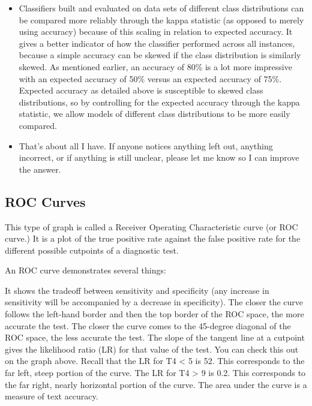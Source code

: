 \documentclass[caret-main.tex]{subfiles}
\begin{document}
\begin{itemize}
\item Classifiers built and evaluated on data sets of different class distributions can be compared more reliably through the kappa statistic (as opposed to merely using accuracy) because of this scaling in relation to expected accuracy. It gives a better indicator of how the classifier performed across all instances, because a simple accuracy can be skewed if the class distribution is similarly skewed. As mentioned earlier, an accuracy of 80\% is a lot more impressive with an expected accuracy of 50\% versus an expected accuracy of 75\%. Expected accuracy as detailed above is susceptible to skewed class distributions, so by controlling for the expected accuracy through the kappa statistic, we allow models of different class distributions to be more easily compared.

\item That's about all I have. If anyone notices anything left out, anything incorrect, or if anything is still unclear, please let me know so I can improve the answer.
\end{itemize}


\newpage
\subsection{ROC Curves}


This type of graph is called a Receiver Operating Characteristic curve (or ROC curve.) It is a plot of the true positive rate against the false positive rate for the different possible cutpoints of a diagnostic test.

An ROC curve demonstrates several things:

It shows the tradeoff between sensitivity and specificity (any increase in sensitivity will be accompanied by a decrease in specificity).
The closer the curve follows the left-hand border and then the top border of the ROC space, the more accurate the test.
The closer the curve comes to the 45-degree diagonal of the ROC space, the less accurate the test.
The slope of the tangent line at a cutpoint gives the likelihood ratio (LR) for that value of the test. You can check this out on the graph above. Recall that the LR for T4 < 5 is 52. This corresponds to the far left, steep portion of the curve. The LR for T4 > 9 is 0.2. This corresponds to the far right, nearly horizontal portion of the curve.
The area under the curve is a measure of text accuracy.
\end{document}
